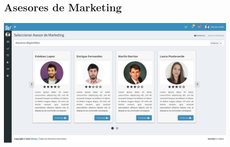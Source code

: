 \documentclass[oneside]{book}
\begin{document}
\medskip
\subsection{Asesores de Marketing}

\includegraphics[width=0.9\textwidth]{images/asesorDeMarketing.jpg}



\bigskip










\end{document}
